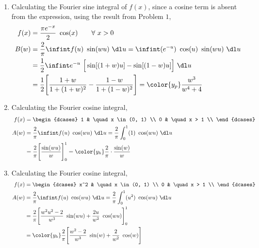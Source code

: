 \begin{enumerate}
    \item Calculating the Fourier sine integral of $ f(x) $, since a cosine term is
          absent from the expression, using the result from Problem $ 1 $,
          \begin{align}
              f(x) & = \frac{\pi e^{-x}}{2}\ \cos(x) \qquad \forall\  x > 0 \\
              B(w) & = \frac{2}{\pi} \infint f(u)\ \sin(wu)\ \dl u
              = \infint (e^{-u})\ \cos(u)\ \sin(wu)\ \dl u                  \\
                   & = \frac{1}{2}\infint e^{-u}\ \Big[ \sin[(1+w)u]
              - \sin[(1-w)u]\Big]\ \dl u                                    \\
                   & = \frac{1}{2} \Bigg[ \frac{1+w}{1 + (1+w)^2}
                  - \frac{1-w}{1 + (1-w)^2} \Bigg]
              = \color{y_p} \frac{w^3}{w^4 + 4}
          \end{align}

    \item Calculating the Fourier cosine integral,
          \begin{align}
              f(x) & = \begin{dcases}
                           1 & \quad x \in (0, 1) \\
                           0 & \quad x > 1        \\
                       \end{dcases}                             \\
              A(w) & = \frac{2}{\pi} \infint f(u)\ \cos(wu)\ \dl u
              = \frac{2}{\pi} \int_{0}^{1} (1)\ \cos(wu)\ \dl u           \\
                   & = \frac{2}{\pi}\Bigg[ \frac{\sin(wu)}{w}  \Bigg]_0^1
              = \color{y_h} \frac{2}{\pi} \cdot \frac{\sin(w)}{w}
          \end{align}

    \item Calculating the Fourier cosine integral,
          \begin{align}
              f(x) & = \begin{dcases}
                           x^2 & \quad x \in (0, 1) \\
                           0   & \quad x > 1        \\
                       \end{dcases}                             \\
              A(w) & = \frac{2}{\pi} \infint f(u)\ \cos(wu)\ \dl u
              = \frac{2}{\pi} \int_{0}^{1} (u^2)\ \cos(wu)\ \dl u           \\
                   & = \frac{2}{\pi}\Bigg[ \frac{w^2u^2 - 2}{w^3}\ \sin(wu)
              + \frac{2u}{w^2}\ \cos(wu)  \Bigg]_0^1                        \\
                   & = \color{y_h} \frac{2}{\pi}\Bigg[ \frac{w^2 - 2}{w^3}
                  \ \sin(w) + \frac{2}{w^2}\ \cos(w)  \Bigg]
          \end{align}


\end{enumerate}
